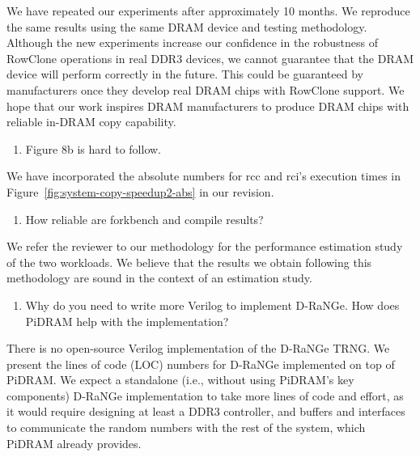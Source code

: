 We have repeated our experiments after approximately 10 months. We reproduce the same results using the same DRAM device and testing methodology. Although the new experiments increase our confidence in the robustness of RowClone operations in real DDR3 devices, we cannot guarantee that the DRAM device will perform correctly in the future. This could be guaranteed by manufacturers once they develop real DRAM chips with RowClone support. We hope that our work inspires DRAM manufacturers to produce DRAM chips with reliable in-DRAM copy capability.

\bigbreak
\begin{tcolorbox}
    \begin{enumerate}[label=R4/\arabic*]
        \addtocounter{enumi}{10}
        \item \label{q:r4q11} Figure 8b is hard to follow.
    \end{enumerate}
\end{tcolorbox} 

We have incorporated the absolute numbers for rcc and rci’s execution times in Figure~\ref{fig:system-copy-speedup2-abs} in our revision.

\bigbreak
\begin{tcolorbox}
    \begin{enumerate}[label=R4/\arabic*]
        \addtocounter{enumi}{11}
        \item \label{q:r4q12} How reliable are forkbench and compile results?
    \end{enumerate}
\end{tcolorbox} 

We refer the reviewer to our methodology for the performance estimation study of the two workloads. We believe that the results we obtain following this methodology are sound in the context of an estimation study.

\bigbreak
\begin{tcolorbox}
    \begin{enumerate}[label=R4/\arabic*]
        \addtocounter{enumi}{12}
        \item \label{q:r4q13} Why do you need to write more Verilog to implement D-RaNGe. How does PiDRAM help with the implementation?
    \end{enumerate}
\end{tcolorbox} 

There is no open-source Verilog implementation of the D-RaNGe TRNG. We present the lines of code (LOC) numbers for D-RaNGe implemented on top of PiDRAM. We expect a standalone (i.e., without using PiDRAM’s key components) D-RaNGe implementation to take more lines of code and effort, as it would require designing at least a DDR3 controller, and buffers and interfaces to communicate the random numbers with the rest of the system, which PiDRAM already provides. 

